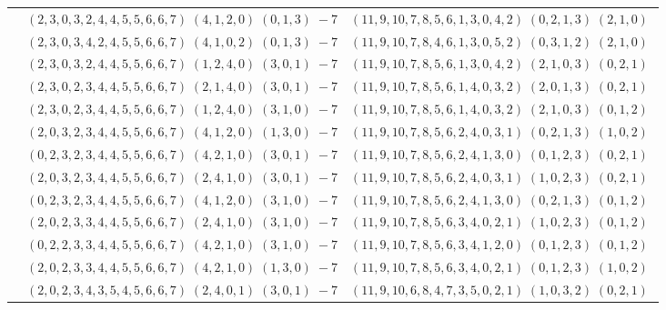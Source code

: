 \documentclass[11pt]{article}
\begin{document}
\begin{longtable}[l]{|c|c|c|}
 \cline{2-3} 
 & $(2 ,3 ,0 ,3 ,2 ,4 ,4 ,5 ,5 ,6 ,6 ,7) \;(4 ,1 ,2 ,0) \;(0 ,1 ,3) \;-7$ & $(11 ,9 ,10 ,7 ,8 ,5 ,6 ,1 ,3 ,0 ,4 ,2) \;(0 ,2 ,1 ,3) \;(2 ,1 ,0) \;$\\ 
 \cline{2-3} 
 & $(2 ,3 ,0 ,3 ,4 ,2 ,4 ,5 ,5 ,6 ,6 ,7) \;(4 ,1 ,0 ,2) \;(0 ,1 ,3) \;-7$ & $(11 ,9 ,10 ,7 ,8 ,4 ,6 ,1 ,3 ,0 ,5 ,2) \;(0 ,3 ,1 ,2) \;(2 ,1 ,0) \;$\\ 
 \cline{2-3} 
 & $(2 ,3 ,0 ,3 ,2 ,4 ,4 ,5 ,5 ,6 ,6 ,7) \;(1 ,2 ,4 ,0) \;(3 ,0 ,1) \;-7$ & $(11 ,9 ,10 ,7 ,8 ,5 ,6 ,1 ,3 ,0 ,4 ,2) \;(2 ,1 ,0 ,3) \;(0 ,2 ,1) \;$\\ 
 \cline{2-3} 
 & $(2 ,3 ,0 ,2 ,3 ,4 ,4 ,5 ,5 ,6 ,6 ,7) \;(2 ,1 ,4 ,0) \;(3 ,0 ,1) \;-7$ & $(11 ,9 ,10 ,7 ,8 ,5 ,6 ,1 ,4 ,0 ,3 ,2) \;(2 ,0 ,1 ,3) \;(0 ,2 ,1) \;$\\ 
 \cline{2-3} 
 & $(2 ,3 ,0 ,2 ,3 ,4 ,4 ,5 ,5 ,6 ,6 ,7) \;(1 ,2 ,4 ,0) \;(3 ,1 ,0) \;-7$ & $(11 ,9 ,10 ,7 ,8 ,5 ,6 ,1 ,4 ,0 ,3 ,2) \;(2 ,1 ,0 ,3) \;(0 ,1 ,2) \;$\\ 
 \cline{2-3} 
 & $(2 ,0 ,3 ,2 ,3 ,4 ,4 ,5 ,5 ,6 ,6 ,7) \;(4 ,1 ,2 ,0) \;(1 ,3 ,0) \;-7$ & $(11 ,9 ,10 ,7 ,8 ,5 ,6 ,2 ,4 ,0 ,3 ,1) \;(0 ,2 ,1 ,3) \;(1 ,0 ,2) \;$\\ 
 \cline{2-3} 
 & $(0 ,2 ,3 ,2 ,3 ,4 ,4 ,5 ,5 ,6 ,6 ,7) \;(4 ,2 ,1 ,0) \;(3 ,0 ,1) \;-7$ & $(11 ,9 ,10 ,7 ,8 ,5 ,6 ,2 ,4 ,1 ,3 ,0) \;(0 ,1 ,2 ,3) \;(0 ,2 ,1) \;$\\ 
 \cline{2-3} 
 & $(2 ,0 ,3 ,2 ,3 ,4 ,4 ,5 ,5 ,6 ,6 ,7) \;(2 ,4 ,1 ,0) \;(3 ,0 ,1) \;-7$ & $(11 ,9 ,10 ,7 ,8 ,5 ,6 ,2 ,4 ,0 ,3 ,1) \;(1 ,0 ,2 ,3) \;(0 ,2 ,1) \;$\\ 
 \cline{2-3} 
 & $(0 ,2 ,3 ,2 ,3 ,4 ,4 ,5 ,5 ,6 ,6 ,7) \;(4 ,1 ,2 ,0) \;(3 ,1 ,0) \;-7$ & $(11 ,9 ,10 ,7 ,8 ,5 ,6 ,2 ,4 ,1 ,3 ,0) \;(0 ,2 ,1 ,3) \;(0 ,1 ,2) \;$\\ 
 \cline{2-3} 
 & $(2 ,0 ,2 ,3 ,3 ,4 ,4 ,5 ,5 ,6 ,6 ,7) \;(2 ,4 ,1 ,0) \;(3 ,1 ,0) \;-7$ & $(11 ,9 ,10 ,7 ,8 ,5 ,6 ,3 ,4 ,0 ,2 ,1) \;(1 ,0 ,2 ,3) \;(0 ,1 ,2) \;$\\ 
 \cline{2-3} 
 & $(0 ,2 ,2 ,3 ,3 ,4 ,4 ,5 ,5 ,6 ,6 ,7) \;(4 ,2 ,1 ,0) \;(3 ,1 ,0) \;-7$ & $(11 ,9 ,10 ,7 ,8 ,5 ,6 ,3 ,4 ,1 ,2 ,0) \;(0 ,1 ,2 ,3) \;(0 ,1 ,2) \;$\\ 
 \cline{2-3} 
 & $(2 ,0 ,2 ,3 ,3 ,4 ,4 ,5 ,5 ,6 ,6 ,7) \;(4 ,2 ,1 ,0) \;(1 ,3 ,0) \;-7$ & $(11 ,9 ,10 ,7 ,8 ,5 ,6 ,3 ,4 ,0 ,2 ,1) \;(0 ,1 ,2 ,3) \;(1 ,0 ,2) \;$\\ 
 \cline{2-3} 
 & $(2 ,0 ,2 ,3 ,4 ,3 ,5 ,4 ,5 ,6 ,6 ,7) \;(2 ,4 ,0 ,1) \;(3 ,0 ,1) \;-7$ & $(11 ,9 ,10 ,6 ,8 ,4 ,7 ,3 ,5 ,0 ,2 ,1) \;(1 ,0 ,3 ,2) \;(0 ,2 ,1) \;$\\ 

\end{longtable}
\end{document}

